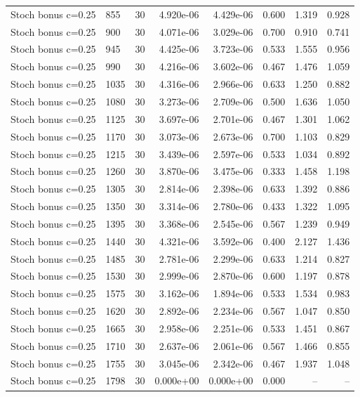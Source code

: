 \begin{scriptsize}
\begin{longtable}{llrrrrrr}
Stoch bonus c=0.25 & 855 & 30 & 4.920e-06 & 4.429e-06 & 0.600 & 1.319 & 0.928 \\
Stoch bonus c=0.25 & 900 & 30 & 4.071e-06 & 3.029e-06 & 0.700 & 0.910 & 0.741 \\
Stoch bonus c=0.25 & 945 & 30 & 4.425e-06 & 3.723e-06 & 0.533 & 1.555 & 0.956 \\
Stoch bonus c=0.25 & 990 & 30 & 4.216e-06 & 3.602e-06 & 0.467 & 1.476 & 1.059 \\
Stoch bonus c=0.25 & 1035 & 30 & 4.316e-06 & 2.966e-06 & 0.633 & 1.250 & 0.882 \\
Stoch bonus c=0.25 & 1080 & 30 & 3.273e-06 & 2.709e-06 & 0.500 & 1.636 & 1.050 \\
Stoch bonus c=0.25 & 1125 & 30 & 3.697e-06 & 2.701e-06 & 0.467 & 1.301 & 1.062 \\
Stoch bonus c=0.25 & 1170 & 30 & 3.073e-06 & 2.673e-06 & 0.700 & 1.103 & 0.829 \\
Stoch bonus c=0.25 & 1215 & 30 & 3.439e-06 & 2.597e-06 & 0.533 & 1.034 & 0.892 \\
Stoch bonus c=0.25 & 1260 & 30 & 3.870e-06 & 3.475e-06 & 0.333 & 1.458 & 1.198 \\
Stoch bonus c=0.25 & 1305 & 30 & 2.814e-06 & 2.398e-06 & 0.633 & 1.392 & 0.886 \\
Stoch bonus c=0.25 & 1350 & 30 & 3.314e-06 & 2.780e-06 & 0.433 & 1.322 & 1.095 \\
Stoch bonus c=0.25 & 1395 & 30 & 3.368e-06 & 2.545e-06 & 0.567 & 1.239 & 0.949 \\
Stoch bonus c=0.25 & 1440 & 30 & 4.321e-06 & 3.592e-06 & 0.400 & 2.127 & 1.436 \\
Stoch bonus c=0.25 & 1485 & 30 & 2.781e-06 & 2.299e-06 & 0.633 & 1.214 & 0.827 \\
Stoch bonus c=0.25 & 1530 & 30 & 2.999e-06 & 2.870e-06 & 0.600 & 1.197 & 0.878 \\
Stoch bonus c=0.25 & 1575 & 30 & 3.162e-06 & 1.894e-06 & 0.533 & 1.534 & 0.983 \\
Stoch bonus c=0.25 & 1620 & 30 & 2.892e-06 & 2.234e-06 & 0.567 & 1.047 & 0.850 \\
Stoch bonus c=0.25 & 1665 & 30 & 2.958e-06 & 2.251e-06 & 0.533 & 1.451 & 0.867 \\
Stoch bonus c=0.25 & 1710 & 30 & 2.637e-06 & 2.061e-06 & 0.567 & 1.466 & 0.855 \\
Stoch bonus c=0.25 & 1755 & 30 & 3.045e-06 & 2.342e-06 & 0.467 & 1.937 & 1.048 \\
Stoch bonus c=0.25 & 1798 & 30 & 0.000e+00 & 0.000e+00 & 0.000 & -- & -- \\

\end{longtable}
\end{scriptsize}
